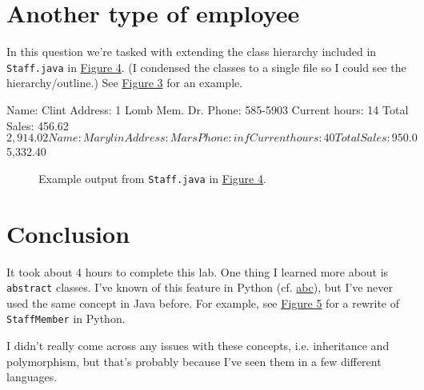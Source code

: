 \documentclass[leqno, 11pt]{article}
\newcommand{\iftcodefigure}[3]{%
  \begin{codefigure}
    \label{#1}
    \addtocounter{figure}{-1}
    
  \end{codefigure}
}
\begin{document}
\section{Another type of employee}
In this question we're tasked with extending the class hierarchy included in \texttt{Staff.java} in \hyperref[fig:two]{Figure 4}. (I condensed the classes to a single file so I could see the hierarchy/outline.) See \hyperref[fig:four]{Figure 3} for an example.
\begin{verbbox}[\mbox{}\scriptsize]
Name:    Clint
Address: 1 Lomb Mem. Dr.
Phone:   585-5903
Current hours: 14
Total Sales: 456.62
$2,914.02

Name:    Marylin
Address: Mars
Phone:   inf
Current hours: 40
Total Sales: 950.0
$5,332.40
\end{verbbox}
\begin{figure}[h!]
  \centering
  \theverbbox
  \caption{Example output from \texttt{Staff.java} in \hyperref[fig:two]{Figure 4}.}
  \label{fig:four}
\end{figure}
\iftcodefigure{fig:two}{Staff.java.}{%
  /home/brandon/eclipse-workspace/ift_194_labs/src/lab_5/Staff.java}
\section{Conclusion}
It took about 4 hours to complete this lab. One thing I learned more about is  \texttt{abstract} classes. I've known of this feature in Python (cf. \href{https://docs.python.org/3/library/abc.html}{abc}), but I've never used the same concept in Java before. For example, see \hyperref[fig:five]{Figure 5} for a rewrite of \texttt{StaffMember} in Python.

I didn't really come across any issues with these concepts, i.e. inheritance and polymorphism, but that's probably because I've seen them in a few different languages.
\iftcodefigure{fig:five}{staff.py.}{%
  /home/brandon/eclipse-workspace/ift_194_labs/src/lab_5/staff.py}
\end{document}
